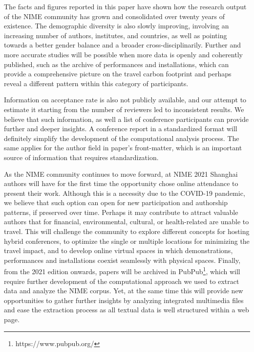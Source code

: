 \documentclass[sigconf]{nimeart}
\begin{document}
The facts and figures reported in this paper have shown how the research output of the NIME community has grown and consolidated over twenty years of existence. The demographic diversity is also slowly improving, involving an increasing number of authors, institutes, and countries, as well as pointing towards a better gender balance and a broader cross-disciplinarily. Further and more accurate studies will be possible when more data is openly and coherently published, such as the archive of performances and installations, which can provide a comprehensive picture on the travel carbon footprint and perhaps reveal a different pattern within this category of participants.

Information on acceptance rate is also not publicly available, and our attempt to estimate it starting from the number of reviewers led to inconsistent results. We believe that such information, as well a list of conference participants can provide further and deeper insights. A conference report in a standardized format will definitely simplify the development of the computational analysis process. The same applies for the author field in paper's front-matter, which is an important source of information that requires standardization.

As the NIME community continues to move forward, at NIME 2021 Shanghai authors will have for the first time the opportunity chose online attendance to present their work. Although this is a necessity due to the COVID-19 pandemic, we believe that such option can open for new participation and authorship patterns, if preserved over time. Perhaps it may contribute to attract valuable authors that for financial, environmental, cultural, or health-related are unable to travel. This will challenge the community to explore different concepts for hosting hybrid conferences, to optimize the single or multiple locations for minimizing the travel impact, and to develop online virtual spaces in which demonstrations, performances and installations coexist seamlessly with physical spaces. Finally, from the 2021 edition onwards, papers will be archived in PubPub\footnote{https://www.pubpub.org/}, which will require further development of the computational approach we used to extract data and analyze the NIME corpus. Yet, at the same time this will provide new opportunities to gather further insights by analyzing integrated multimedia files and ease the extraction process as all textual data is well structured within a web page.



\end{document}
